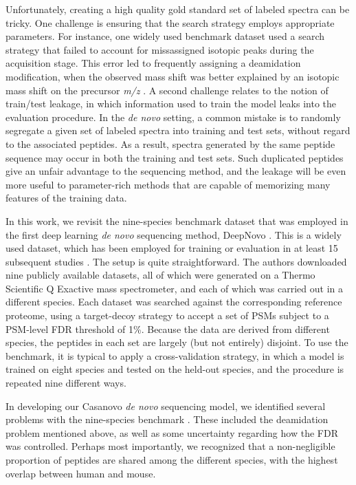 \documentclass{article}
\begin{document}
Unfortunately, creating a high quality gold standard set of labeled spectra can be tricky.
One challenge is ensuring that the search strategy employs appropriate parameters.
For instance, one widely used benchmark dataset \cite{tran2017denovo} used a search strategy that failed to account for missassigned isotopic peaks during the acquisition stage.
This error led to frequently assigning a deamidation modification, when the observed mass shift was better explained by an isotopic mass shift on the precursor \textit{m/z} \cite{bittremieux2024deep}.
A second challenge relates to the notion of train/test leakage, in which information used to train the model leaks into the evaluation procedure.
In the \textit{de novo} setting, a common mistake is to randomly segregate a given set of labeled spectra into training and test sets, without regard to the associated peptides.
As a result, spectra generated by the same peptide sequence may occur in both the training and test sets.
Such duplicated peptides give an unfair advantage to the sequencing method, and the leakage will be even more useful to parameter-rich methods that are capable of memorizing many features of the training data.

In this work, we revisit the nine-species benchmark dataset that was employed in the first deep learning \textit{de novo} sequencing method, DeepNovo \cite{tran2017denovo}.
This is a widely used dataset, which has been employed for training or evaluation in at least 15 subsequent studies \cite{yang2024introducing, yang2022dpst, yang2019pnovo, xia2024adanovo, wu2023biatnovo, qiao2021computationally, liu2020residual, lee2024bidirectional, klaproth2024deep, jin2023contranovo, ge2022deps, eloff2023denovo, ebrahimi2024transformer, yilmaz2022denovo, yilmaz2024sequence}.
The setup is quite straightforward.
The authors downloaded nine publicly available datasets, all of which were generated on a Thermo Scientific Q Exactive mass spectrometer, and each of which was carried out in a different species.
Each dataset was searched against the corresponding reference proteome, using a target-decoy strategy to accept a set of PSMs subject to a PSM-level FDR threshold of 1\%.
Because the data are derived from different species, the peptides in each set are largely (but not entirely) disjoint.
To use the benchmark, it is typical to apply a cross-validation strategy, in which a model is trained on eight species and tested on the held-out species, and the procedure is repeated nine different ways.

In developing our Casanovo \textit{de novo} sequencing model, we identified several problems with the nine-species benchmark \cite{yilmaz2024sequence}.
These included the deamidation problem mentioned above, as well as some uncertainty regarding how the FDR was controlled.
Perhaps most importantly, we recognized that a non-negligible proportion of peptides are shared among the different species, with the highest overlap between human and mouse.
\end{document}
